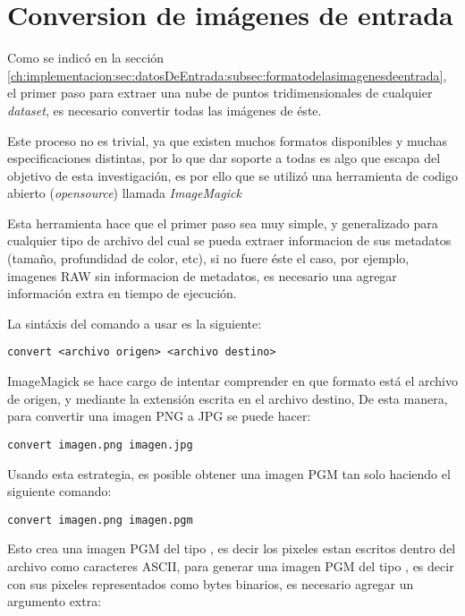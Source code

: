 \section{Conversion de imágenes de entrada}
\label{ch:implementacion:sec:conversiondeimagenesdeentrada}

Como se indicó en la sección \ref{ch:implementacion:sec:datosDeEntrada:subsec:formatodelasimagenesdeentrada}, el primer paso para extraer una nube de puntos tridimensionales de cualquier \emph{dataset}, es necesario convertir todas las imágenes de éste.

Este proceso no es trivial, ya que existen muchos formatos disponibles y muchas especificaciones distintas, por lo que dar soporte a todas es algo que escapa del objetivo de esta investigación, es por ello que se utilizó una herramienta de codigo abierto (\emph{opensource}) llamada \emph{ImageMagick}

Esta herramienta hace que el primer paso sea muy simple, y generalizado para cualquier tipo de archivo del cual se pueda extraer informacion de sus metadatos (tamaño, profundidad de color, etc), si no fuere éste el caso, por ejemplo, imagenes RAW sin informacion de metadatos, es necesario una agregar información extra en tiempo de ejecución.

La sintáxis del comando a usar es la siguiente:

\begin{verbatim}
convert <archivo origen> <archivo destino>
\end{verbatim}

ImageMagick se hace cargo de intentar comprender en que formato está el archivo de origen, y mediante la extensión escrita en el archivo destino, De esta manera, para convertir una imagen PNG a JPG se puede hacer:

\begin{verbatim}
convert imagen.png imagen.jpg
\end{verbatim}

Usando esta estrategia, es posible obtener una imagen PGM tan solo haciendo el siguiente comando:

\begin{verbatim}
convert imagen.png imagen.pgm
\end{verbatim}

Esto crea una imagen PGM del tipo , es decir los pixeles estan escritos dentro del archivo como caracteres ASCII, para generar una imagen PGM del tipo , es decir con sus pixeles representados como bytes binarios, es necesario agregar un argumento extra:

